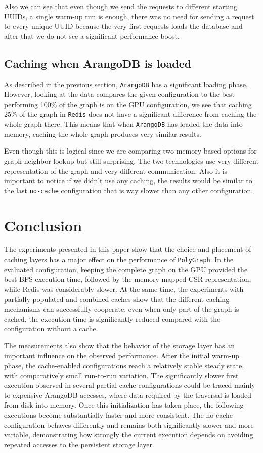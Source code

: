 \documentclass[11pt,a4paper]{article}
\begin{document}
Also we can see that even though we send the requests to different starting UUIDs, a single warm-up run is enough, there was no need for sending a request to every unique UUID because the very first requests loads the database and after that we do not see a significant performance boost. 

\subsection{Caching when ArangoDB is loaded}

As described in the previous section, \texttt{ArangoDB} has a significant loading phase. However, looking at the data compares the given configuration to the best performing 100\% of the graph is on the GPU configuration, we see that caching 25\% of the graph in \texttt{Redis} does not have a significant difference from caching the whole graph there. This means that when \texttt{ArangoDB} has loaded the data into memory, caching the whole graph produces very similar results. 

Even though this is logical since we are comparing two memory based options for graph neighbor lookup but still surprising. The two technologies use very different representation of the graph and very different communication. Also it is important to notice if we didn't use any caching, the results would be similar to the last \texttt{no-cache} configuration that is way slower than any other configuration.

\section{Conclusion}

The experiments presented in this paper show that the choice and placement of caching layers has a major effect on the performance of \texttt{PolyGraph}. In the evaluated configuration, keeping the complete graph on the GPU provided the best BFS execution time, followed by the memory-mapped CSR representation, while Redis was considerably slower. At the same time, the experiments with partially populated and combined caches show that the different caching mechanisms can successfully cooperate: even when only part of the graph is cached, the execution time is significantly reduced compared with the configuration without a cache.

The measurements also show that the behavior of the storage layer has an important influence on the observed performance. After the initial warm-up phase, the cache-enabled configurations reach a relatively stable steady state, with comparatively small run-to-run variation. The significantly slower first execution observed in several partial-cache configurations could be traced mainly to expensive ArangoDB accesses, where data required by the traversal is loaded from disk into memory. Once this initialization has taken place, the following executions become substantially faster and more consistent. The no-cache configuration behaves differently and remains both significantly slower and more variable, demonstrating how strongly the current execution depends on avoiding repeated accesses to the persistent storage layer. 
\end{document}

